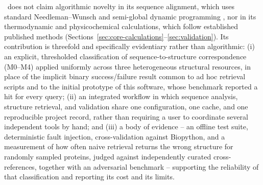 \bsi\ does not claim algorithmic novelty in its sequence alignment, which
uses standard Needleman--Wunsch and semi-global dynamic programming
\citep{needleman1970}, nor in its thermodynamic and physicochemical
calculations, which follow established published methods
(Sections~\ref{sec:core-calculations}--\ref{sec:validation}). Its
contribution is threefold and specifically evidentiary rather than
algorithmic: (i) an explicit, thresholded classification of
sequence-to-structure correspondence (M0--M4) applied uniformly across
three heterogeneous structural resources, in place of the implicit
binary success/failure result common to ad hoc retrieval scripts and to the
initial prototype of this software, whose benchmark reported a hit for every query; (ii) an integrated workflow in which
sequence analysis, structure retrieval, and validation share one
configuration, one cache, and one reproducible project record, rather than
requiring a user to coordinate several independent tools by hand; and (iii)
a body of evidence -- an offline test suite, deterministic fault injection,
cross-validation against Biopython, and a measurement of how often naive
retrieval returns the wrong structure for  randomly sampled proteins,
judged against independently curated cross-references, together with an
adversarial benchmark -- supporting the reliability of that classification and
reporting its cost and its limits.
